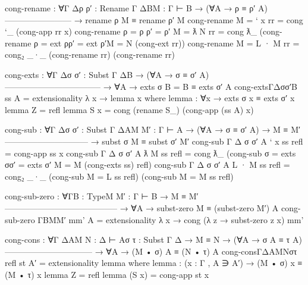 \begin{fence}
\begin{code}
cong-rename : ∀{Γ Δ}{ρ ρ′ : Rename Γ Δ}{B}{M : Γ ⊢ B}
        → (∀{A} → ρ ≡ ρ′ {A})
          ------------------------
        → rename ρ M ≡ rename ρ′ M
cong-rename {M = ` x} rr = cong `_ (cong-app rr x)
cong-rename {ρ = ρ} {ρ′ = ρ′} {M = ƛ N} rr =
   cong ƛ_ (cong-rename {ρ = ext ρ}{ρ′ = ext ρ′}{M = N} (cong-ext rr))
cong-rename {M = L · M} rr =
   cong₂ _·_ (cong-rename rr) (cong-rename rr)
\end{code}
\end{fence}

\begin{fence}
\begin{code}
cong-exts : ∀{Γ Δ}{σ σ′ : Subst Γ Δ}{B}
   → (∀{A} → σ ≡ σ′ {A})
     -----------------------------------
   → ∀{A} → exts σ {B = B} ≡ exts σ′ {A}
cong-exts{Γ}{Δ}{σ}{σ′}{B} ss {A} = extensionality λ x → lemma {x}
   where
   lemma : ∀{x} → exts σ x ≡ exts σ′ x
   lemma {Z} = refl
   lemma {S x} = cong (rename S_) (cong-app (ss {A}) x)
\end{code}
\end{fence}

\begin{fence}
\begin{code}
cong-sub : ∀{Γ Δ}{σ σ′ : Subst Γ Δ}{A}{M M′ : Γ ⊢ A}
            → (∀{A} → σ ≡ σ′ {A})  →  M ≡ M′
              ------------------------------
            → subst σ M ≡ subst σ′ M′
cong-sub {Γ} {Δ} {σ} {σ′} {A} {` x} ss refl = cong-app ss x
cong-sub {Γ} {Δ} {σ} {σ′} {A} {ƛ M} ss refl =
   cong ƛ_ (cong-sub {σ = exts σ}{σ′ = exts σ′} {M = M} (cong-exts ss) refl)
cong-sub {Γ} {Δ} {σ} {σ′} {A} {L · M} ss refl =
   cong₂ _·_ (cong-sub {M = L} ss refl) (cong-sub {M = M} ss refl)
\end{code}
\end{fence}

\begin{fence}
\begin{code}
cong-sub-zero : ∀{Γ}{B : Type}{M M′ : Γ ⊢ B}
  → M ≡ M′
    -----------------------------------------
  → ∀{A} → subst-zero M ≡ (subst-zero M′) {A}
cong-sub-zero {Γ}{B}{M}{M′} mm' {A} =
   extensionality λ x → cong (λ z → subst-zero z x) mm'
\end{code}
\end{fence}

\begin{fence}
\begin{code}
cong-cons : ∀{Γ Δ}{A}{M N : Δ ⊢ A}{σ τ : Subst Γ Δ}
  → M ≡ N  →  (∀{A} → σ {A} ≡ τ {A})
    --------------------------------
  → ∀{A} → (M • σ) {A} ≡ (N • τ) {A}
cong-cons{Γ}{Δ}{A}{M}{N}{σ}{τ} refl st {A′} = extensionality lemma
  where
  lemma : (x : Γ , A ∋ A′) → (M • σ) x ≡ (M • τ) x
  lemma Z = refl
  lemma (S x) = cong-app st x
\end{code}
\end{fence}

